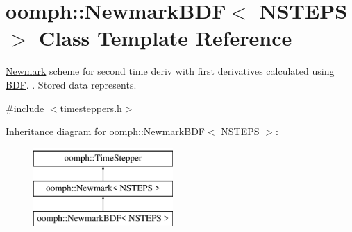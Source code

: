 \hypertarget{classoomph_1_1NewmarkBDF}{}\section{oomph\+:\+:Newmark\+B\+DF$<$ N\+S\+T\+E\+PS $>$ Class Template Reference}
\label{classoomph_1_1NewmarkBDF}


\hyperlink{classoomph_1_1Newmark}{Newmark} scheme for second time deriv with first derivatives calculated using \hyperlink{classoomph_1_1BDF}{B\+DF}. . Stored data represents.  




{\ttfamily \#include $<$timesteppers.\+h$>$}

Inheritance diagram for oomph\+:\+:Newmark\+B\+DF$<$ N\+S\+T\+E\+PS $>$\+:\begin{figure}[H]
\begin{center}
\leavevmode
\includegraphics[height=3.000000cm]{classoomph_1_1NewmarkBDF}
\end{center}
\end{figure}
